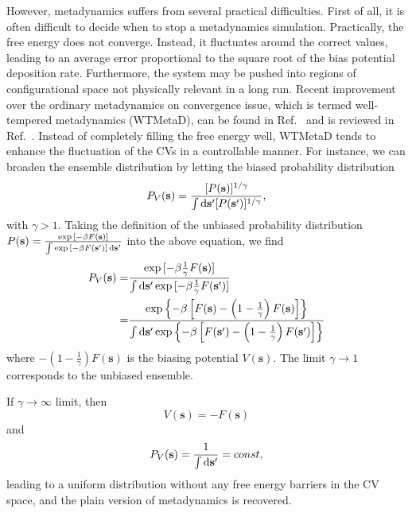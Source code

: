 However, metadynamics suffers from several practical difficulties. First of all, it is often difficult to decide when to stop a metadynamics simulation. Practically, the free energy does not converge. Instead, it fluctuates around the correct values, leading to an average error proportional to the square root of the bias potential deposition rate. Furthermore, the system may be pushed into regions of configurational space not physically relevant in a long run. Recent improvement over the ordinary metadynamics on convergence issue, which is termed well-tempered metadynamics (WTMetaD), can be found in Ref.~\cite{BarducciPRL2008} and is reviewed in Ref.~\cite{ValssonARPC2016}. Instead of completely filling the free energy well, WTMetaD tends to enhance the fluctuation of the CVs in a controllable manner. For instance, we can broaden the ensemble distribution by letting the biased probability distribution
\begin{equation}
	P_V(\mathbf{s})=\frac{[P(\mathbf{s})]^{1/\gamma}}{\int \mathop{}\!\mathrm{d} \mathbf{s}^\prime[P(\mathbf{s}^\prime)]^{1/\gamma}},
	\label{Eq:ES:metadynamics:PvP}
\end{equation}
with $\gamma >1$. Taking the definition of the unbiased probability distribution $P(\mathbf{s})=\frac{\exp{[-\beta F(\mathbf{s})]}}{\int \exp{[-\beta F(\mathbf{s}^\prime)]} \mathop{}\!\mathrm{d}\mathbf{s}^\prime}$ into the above equation, we find
\begin{align}
	P_V(\mathbf{s})=&\frac{\exp{[-\beta \frac{1}{\gamma}F(\mathbf{s})]}}{\int\mathop{}\!\mathrm{d} \mathbf{s}^\prime \exp{[-\beta \frac{1}{\gamma}F(\mathbf{s}^\prime)]}}\notag\\
	               =&\frac{\exp{\left\{-\beta \left[F(\mathbf{s})-\left(1-\frac{1}{\gamma}\right)F(\mathbf{s})\right]\right\}}}{\int\mathop{}\!\mathrm{d} \mathbf{s}^\prime \exp{\left\{-\beta \left[F(\mathbf{s}^\prime)-\left(1-\frac{1}{\gamma}\right)F(\mathbf{s}^\prime)\right]\right\}}}
\end{align}
where
$-\left(1-\frac{1}{\gamma}\right)F(\mathbf{s})$ is the biasing potential $V(\mathbf{s})$. The limit $\gamma \to 1$ corresponds to the unbiased ensemble.

If $\gamma \to \infty$ limit, then
\begin{equation}
	V(\mathbf{s})=-F(\mathbf{s})
\end{equation}
and
\begin{equation}
	P_V(\mathbf{s})=\frac{1}{\int \mathop{}\!\mathrm{d} \mathbf{s}^\prime}=const,
\end{equation}
leading to a uniform distribution without any free energy barriers in the CV space, and the plain version of metadynamics is recovered.


